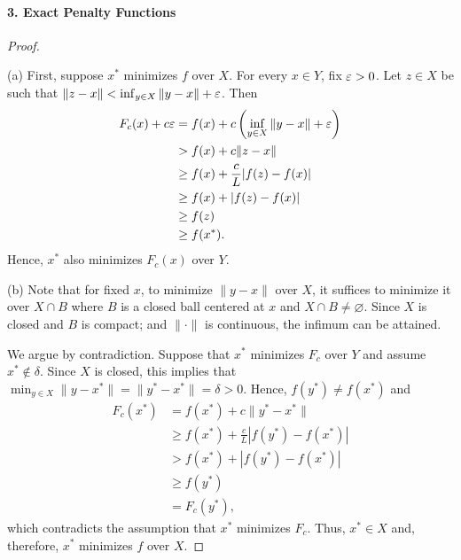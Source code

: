   \paragraph{3. Exact Penalty Functions}
  \begin{proof}
    $\,$\par
    (a) First, suppose $x^*$ minimizes $f$ over $X$. For every $x\in Y$, fix
    $\varepsilon>0$. Let $z\in X$ be such that $\|z-x\|<\inf_{y\in X}\|y-x\|+\varepsilon$.
    Then
    \begin{align*}
      F_c(x)+c\varepsilon
      &=f(x)+c\left(\inf_{y\in X}\|y-x\|+\varepsilon\right)\\
      &>f(x)+c\|z-x\|\\
      &\ge f(x)+\frac{c}{L}|f(z)-f(x)|\\
      &\ge f(x)+|f(z)-f(x)|\\
      &\ge f(z)\\
      &\ge f(x^*).
    \end{align*}
    Hence, $x^*$ also minimizes $F_c(x)$ over $Y$. \par
    (b) Note that for fixed $x$, to minimize $\|y-x\|$ over $X$, it suffices
    to minimize it over $X\cap B$ where $B$ is a closed ball centered at $x$
    and $X\cap B\ne\varnothing$. Since $X$ is closed and $B$ is compact; and
    $\|\cdot\|$ is continuous, the infimum can be attained.\par
    We argue by contradiction. Suppose that $x^*$ minimizes $F_c$ over $Y$
    and assume $x^*\notin\delta$. Since $X$ is closed, this implies that 
    $\min_{y\in X}\|y-x^*\|=\|y^*-x^*\|=\delta>0$. Hence, $f(y^*)\ne f(x^*)$ 
    and
    \begin{align*}
      F_c(x^*)
      &=f(x^*)+c\|y^*-x^*\|\\
      &\ge f(x^*)+\frac{c}{L}|f(y^*)-f(x^*)|\\
      &>f(x^*)+|f(y^*)-f(x^*)|\\
      &\ge f(y^*)\\
      &=F_c(y^*),
    \end{align*}
    which contradicts the assumption that $x^*$ minimizes $F_c$. Thus, $x^*
    \in X$ and, therefore, $x^*$ minimizes $f$ over $X$.
  \end{proof}

